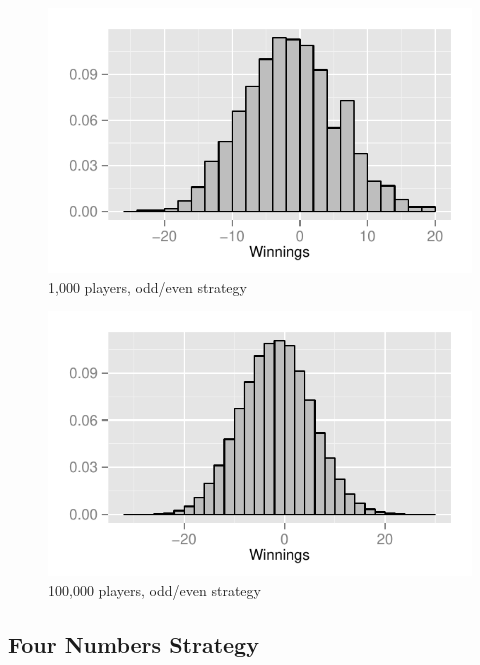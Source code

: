 \documentclass[landscape]{exam}
\begin{document}
  \begin{figure}[H]
    \centering
    \includegraphics[scale = 0.9]{figures/roulette/18_1000_50_fraction.pdf}
    \caption{1,000 players, odd/even strategy}
  \end{figure}

  \begin{figure}[H]
    \centering
    \includegraphics[scale = 0.9]{figures/roulette/18_100000_50_fraction.pdf}
    \caption{100,000 players, odd/even strategy}
  \end{figure}

  \subsection{Four Numbers Strategy} %
  
\end{document}
